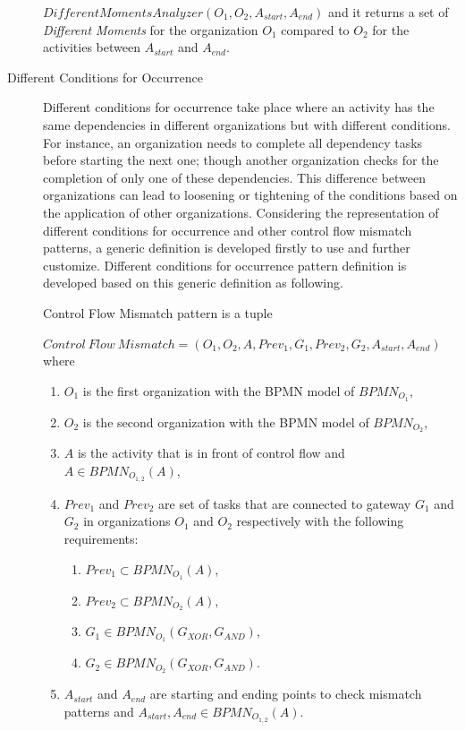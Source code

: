 \begin{description}
\begin{definition}
		$DifferentMomentsAnalyzer(O_{1}, O_{2}, A_{start}, A_{end})$ and it returns a set of \textit{Different Moments} for the organization $O_{1}$ compared to $O_{2}$ for the activities between $A_{start}$ and $A_{end}$.
		\end{definition}

	\item[Different Conditions for Occurrence] Different conditions for occurrence take place where an activity has the same dependencies in different organizations but with different conditions. For instance, an organization needs to complete all dependency tasks before starting the next one; though another organization checks for the completion of only one of these dependencies. This difference between organizations can lead to loosening or tightening of the conditions based on the application of other organizations. Considering the representation of different conditions for occurrence and other control flow mismatch patterns, a generic definition is developed firstly to use and further customize. Different conditions for occurrence pattern definition is developed based on this generic definition as following.
		\theoremstyle{definition}
		\begin{definition}
		Control Flow Mismatch pattern is a tuple 

		${Control\ Flow\ Mismatch} = (O_{1}, O_{2}, A, Prev_{1}, G_{1}, Prev_{2}, G_{2}, A_{start}, A_{end}) $ where 
		\begin{enumerate}
		  \item $O_{1}$ is the first organization with the BPMN model of $BPMN_{{O}_{1}}$,
		  \item $O_{2}$ is the second organization with the BPMN model of $BPMN_{{O}_{2}}$,
		  \item $A$ is the activity that is in front of control flow and $A \in BPMN_{{O}_{1,2}}(A)$,
		  \item $Prev_{1}$ and $Prev_{2}$ are set of tasks that are connected to gateway $G_{1}$ and $G_{2}$ in organizations $O_{1}$ and $O_{2}$ respectively with the following requirements:
			  \begin{enumerate}
				  \item $Prev_{1} \subset BPMN_{{O}_{1}}(A)$,
				  \item $Prev_{2} \subset BPMN_{{O}_{2}}(A)$,
				  \item $G_{1} \in BPMN_{{O}_{1}}(G_{XOR}, G_{AND})$,
	  			  \item $G_{2} \in BPMN_{{O}_{2}}(G_{XOR}, G_{AND})$.
			  \end {enumerate}
 		  \item $A_{start}$ and $A_{end}$ are starting and ending points to check mismatch patterns and $A_{start}, A_{end} \in BPMN_{{O}_{1,2}}(A)$. 
		\end{enumerate}
		\end{definition}


\end{description}
